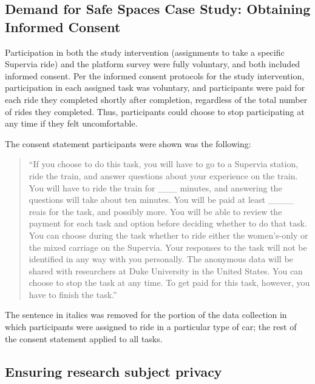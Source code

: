 \documentclass[
]{book}
\begin{document}
\begin{ex}
\hypertarget{demand-for-safe-spaces-case-study-obtaining-informed-consent}{%
\subsection*{Demand for Safe Spaces Case Study: Obtaining Informed Consent}\label{demand-for-safe-spaces-case-study-obtaining-informed-consent}}

Participation in both the study intervention (assignments to take a specific Supervia ride) and the platform survey were fully voluntary, and both included informed consent. Per the informed consent protocols for the study intervention, participation in each assigned task was voluntary, and participants were paid for each ride they completed shortly after completion, regardless of the total number of rides they completed. Thus, participants could choose to stop participating at any time if they felt uncomfortable.

The consent statement participants were shown was the following:

\begin{quote}
``If you choose to do this task, you will have to go to a Supervia station, ride the train, and answer questions about your experience on the train. You will have to ride the train for \_\_\_ minutes, and answering the questions will take about ten minutes. You will be paid at least \_\_\_\_ reais for the task, and possibly more. You will be able to review the payment for each task and option before deciding whether to do that task. You can choose during the task whether to ride either the women's-only or the mixed carriage on the Supervia. Your responses to the task will not be identified in any way with you personally. The anonymous data will be shared with researchers at Duke University in the United States. You can choose to stop the task at any time. To get paid for this task, however, you have to finish the task.''
\end{quote}

The sentence in italics was removed for the portion of the data collection in which participants were assigned to ride in a particular type of car; the rest of the consent statement applied to all tasks.
\end{ex}

\hypertarget{ensuring-research-subject-privacy}{%
\subsection*{Ensuring research subject privacy}\label{ensuring-research-subject-privacy}}
\end{document}
